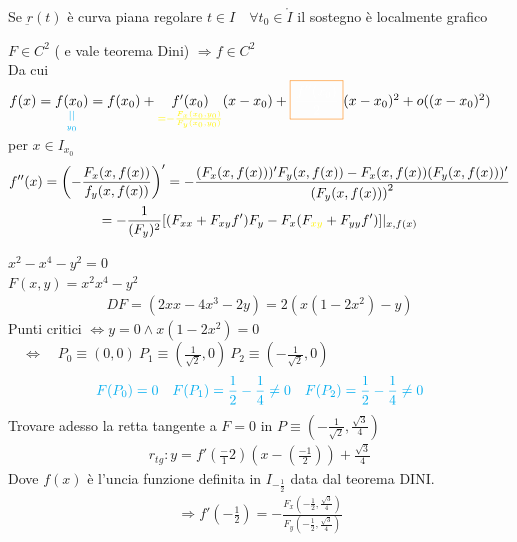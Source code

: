 \documentclass[a4paper, oneside]{article}
\begin{document}
\begin{observation}
    Se $\underbar{r}(t)$ è curva piana regolare $t \in I \quad \forall t_0 \in \mathring{I}$ il sostegno è localmente grafico
\end{observation}
\begin{observation}
    $F \in C^2$ ( e vale teorema Dini) $\Rightarrow f \in C^2$\\
    Da cui $f(x) = \underset{\textcolor{cyan}{\underset{y_0}{||}}}{f(x_0)} = f(x_0) + \underset{\textcolor{yellow}{= -\frac{F_x(x_0,y_0)}{F_y(x_0,y_0)}}}{f'(x_0)}(x-x_0) + \textcolor{orange}{\boxed{\textcolor{white}{\frac{f''(x_0)}{2}}}}(x-x_0)^2 + o((x-x_0)^2)$
    per $x \in I_{x_0}$
    \begin{gather*}
        f''(x) = \left(-\frac{F_x(x,f(x))}{f_y(x,f(x))}\right)' = -\frac{(F_x(x,f(x)))'F_y(x,f(x))-F_x(x,f(x))(F_y(x,f(x)))'}{\left(F_y(x,f(x))\right)^2 }\\
        = -\frac{1}{(F_y)^2}[(F_{xx} + F_{xy}f')F_y-F_x(F_{\textcolor{yellow}{xy}}+F_{yy}f')]\vert_{x,f(x)} 
    \end{gather*}
\end{observation}
\begin{example}
    \begin{center}
    \end{center}
    $x^2-x^4-y^2 = 0$\\
    $F(x,y) = x^2 x^4 -y^2$\\
    \begin{gather*}
        DF = (2xx-4x^3-2y) = 2(x(1-2x^2)-y)
    \end{gather*}
    Punti critici $\Leftrightarrow y = 0 \land x(1-2x^2) = 0$ $\quad \Leftrightarrow \quad P_0\equiv(0,0) \ P_1\equiv(\frac{1}{\sqrt{2}},0) \ P_2\equiv(-\frac{1}{\sqrt{2}},0)$
    \begin{gather*}
        \textcolor{cyan}{F(P_0)= 0 \quad F(P_1) = \frac{1}{2}-\frac{1}{4} \neq 0 \quad F(P_2)= \frac{1}{2}-\frac{1}{4} \neq 0}
    \end{gather*}
    Trovare adesso la retta tangente a $F=0$ in $P \equiv (-\frac{1}{\sqrt{2}}, \frac{\sqrt{3}}{4})$\\
    \begin{gather*}
        r_{tg}: y=f'(\frac-{1}{2})(x-(\frac{-1}{2})) + \frac{\sqrt{3}}{4}
    \end{gather*}
    Dove $f(x)$ è l'uncia funzione definita in $I_{-\frac{1}{2}}$ data dal teorema DINI.
    \begin{gather*}
        \Rightarrow f'(-\frac{1}{2}) = -\frac{F_x(-\frac{1}{2},\frac{\sqrt{3}}{4})}{F_y(-\frac{1}{2},\frac{\sqrt{3}}{4})}
    \end{gather*}

\end{example}
\end{document}
